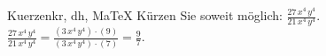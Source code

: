 \begin{MAufgabe}{Kuerzen}{kr, dh, MaTeX}
K\"urzen Sie soweit m\"oglich: $\frac{27\, x^4\, y^4}{21\, x^4\, y^4}$.\\ 
\ifLsg\MLoesung
\quad $\frac{27\, x^4\, y^4}{21\, x^4\, y^4}=\frac{(3\, x^4\, y^4)\cdot(9)}{(3\, x^4\, y^4)\cdot(7)}=\frac{9}{7}$.\else\relax\fi
 \end{MAufgabe}